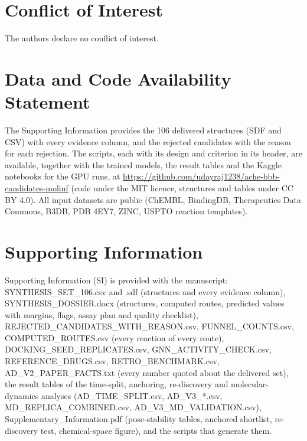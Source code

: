 \documentclass[11pt,a4paper]{article}
\begin{document}
\section*{Conflict of Interest}

The authors declare no conflict of interest.

\section*{Data and Code Availability Statement}

The Supporting Information provides the 106 delivered structures (SDF and CSV) with every evidence column, and the rejected candidates with the reason for each rejection. The scripts, each with its design and criterion in its header, are available, together with the trained models, the result tables and the Kaggle notebooks for the GPU runs, at \url{https://github.com/udayraj1238/ache-bbb-candidates-molinf} (code under the MIT licence, structures and tables under CC BY 4.0). All input datasets are public (ChEMBL, BindingDB, Therapeutics Data Commons, B3DB, PDB 4EY7, ZINC, USPTO reaction templates).

\section*{Supporting Information}

Supporting Information (SI) is provided with the manuscript: SYNTHESIS\_SET\_106.csv and .sdf (structures and every evidence column), SYNTHESIS\_DOSSIER.docx (structures, computed routes, predicted values with margins, flags, assay plan and quality checklist), REJECTED\_CANDIDATES\_WITH\_REASON.csv, FUNNEL\_COUNTS.csv, COMPUTED\_ROUTES.csv (every reaction of every route), DOCKING\_SEED\_REPLICATES.csv, GNN\_ACTIVITY\_CHECK.csv, REFERENCE\_DRUGS.csv, RETRO\_BENCHMARK.csv, AD\_V2\_PAPER\_FACTS.txt (every number quoted about the delivered set), the result tables of the time-split, anchoring, re-discovery and molecular-dynamics analyses (AD\_TIME\_SPLIT.csv, AD\_V3\_*.csv, MD\_REPLICA\_COMBINED.csv, AD\_V3\_MD\_VALIDATION.csv), Supplementary\_Information.pdf (pose-stability tables, anchored shortlist, re-discovery test, chemical-space figure), and the scripts that generate them.



\end{document}
